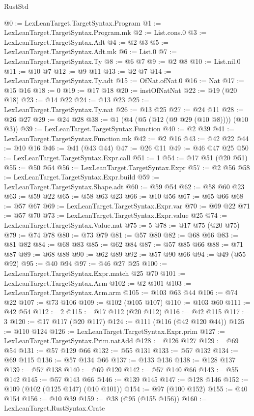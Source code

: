 \begin{lexlean}{RustStd}
\begin{coremodule}
@0 := LexLeanTarget.TargetSyntax.Program
@1 := LexLeanTarget.TargetSyntax.Program.mk
@2 := List.cons.{0}
@3 := LexLeanTarget.TargetSyntax.Adt
@4 := @2 @3
@5 := LexLeanTarget.TargetSyntax.Adt.mk
@6 := List.{0}
@7 := LexLeanTarget.TargetSyntax.Ty
@8 := @6 @7
@9 := @2 @8
@10 := List.nil.{0}
@11 := @10 @7
@12 := @9 @11
@13 := @2 @7
@14 := LexLeanTarget.TargetSyntax.Ty.adt
@15 := OfNat.ofNat.{0}
@16 := Nat
@17 := @15 @16
@18 := 0
@19 := @17 @18
@20 := instOfNatNat
@22 := @19 (@20 @18)
@23 := @14 @22
@24 := @13 @23
@25 := LexLeanTarget.TargetSyntax.Ty.nat
@26 := @13 @25
@27 := @24 @11
@28 := @26 @27
@29 := @24 @28
@38 := @1 (@4 (@5 (@12 (@9 @29 (@10 @8)))) (@10 @3))
@39 := LexLeanTarget.TargetSyntax.Function
@40 := @2 @39
@41 := LexLeanTarget.TargetSyntax.Function.mk
@42 := @2 @16
@43 := @42 @22
@44 := @10 @16
@46 := @41 (@43 @44)
@47 := @26 @11
@49 := @46 @47 @25
@50 := LexLeanTarget.TargetSyntax.Expr.call
@51 := 1
@54 := @17 @51 (@20 @51)
@55 := @50 @54
@56 := LexLeanTarget.TargetSyntax.Expr
@57 := @2 @56
@58 := LexLeanTarget.TargetSyntax.Expr.build
@59 := LexLeanTarget.TargetSyntax.Shape.adt
@60 := @59 @54
@62 := @58 @60 @23
@63 := @59 @22
@65 := @58 @63 @23
@66 := @10 @56
@67 := @65 @66
@68 := @57 @67
@69 := LexLeanTarget.TargetSyntax.Expr.var
@70 := @69 @22
@71 := @57 @70
@73 := LexLeanTarget.TargetSyntax.Expr.value @25
@74 := LexLeanTarget.TargetSyntax.Value.nat
@75 := 5
@78 := @17 @75 (@20 @75)
@79 := @74 @78
@80 := @73 @79
@81 := @57 @80
@82 := @68 @66
@83 := @81 @82
@84 := @68 @83
@85 := @62 @84
@87 := @57 @85 @66
@88 := @71 @87
@89 := @68 @88
@90 := @62 @89
@92 := @57 @90 @66
@94 := @49 (@55 @92)
@95 := @40 @94
@97 := @46 @27 @25
@100 := LexLeanTarget.TargetSyntax.Expr.match @25 @70
@101 := LexLeanTarget.TargetSyntax.Arm
@102 := @2 @101
@103 := LexLeanTarget.TargetSyntax.Arm.arm
@105 := @103 @63 @44
@106 := @74 @22
@107 := @73 @106
@109 := @102 (@105 @107)
@110 := @103 @60
@111 := @42 @54
@112 := 2
@115 := @17 @112 (@20 @112)
@116 := @42 @115
@117 := 3
@120 := @17 @117 (@20 @117)
@124 := @111 (@116 (@42 @120 @44))
@125 := @110 @124
@126 := LexLeanTarget.TargetSyntax.Expr.prim
@127 := LexLeanTarget.TargetSyntax.Prim.natAdd
@128 := @126 @127
@129 := @69 @54
@131 := @57 @129 @66
@132 := @55 @131
@133 := @57 @132
@134 := @69 @115
@136 := @57 @134 @66
@137 := @133 @136
@138 := @128 @137
@139 := @57 @138
@140 := @69 @120
@142 := @57 @140 @66
@143 := @55 @142
@145 := @57 @143 @66
@146 := @139 @145
@147 := @128 @146
@152 := @109 (@102 (@125 @147) (@10 @101))
@154 := @97 (@100 @152)
@155 := @40 @154
@156 := @10 @39
@159 := @38 (@95 (@155 @156))
@160 := LexLeanTarget.RustSyntax.Crate

\end{coremodule}
\end{lexlean}
